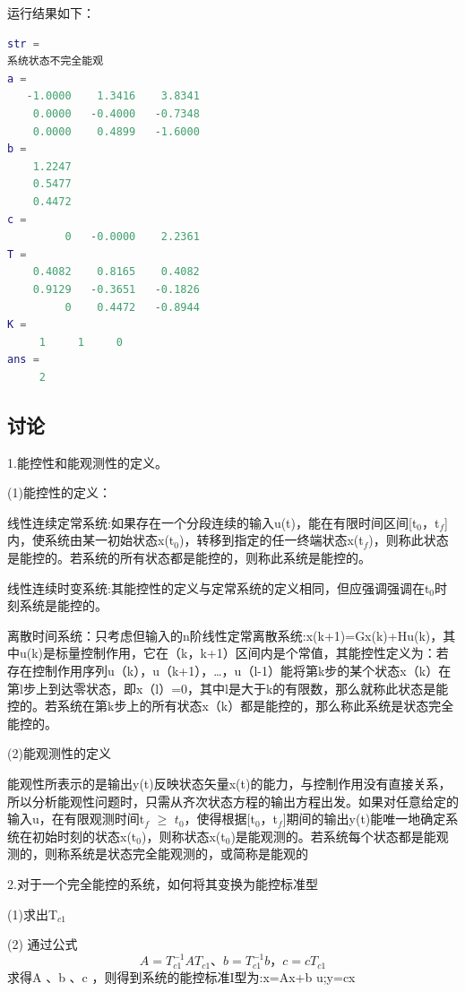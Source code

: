 \documentclass[UTF8]{ctexart}
\begin{document}
\par 运行结果如下：		
\par  \begin{lstlisting}[language=matlab,escapeinside=``]	
str =
系统状态不完全能观
a =
   -1.0000    1.3416    3.8341
    0.0000   -0.4000   -0.7348
    0.0000    0.4899   -1.6000
b =
    1.2247
    0.5477
    0.4472
c =
         0   -0.0000    2.2361
T =
    0.4082    0.8165    0.4082
    0.9129   -0.3651   -0.1826
         0    0.4472   -0.8944
K =
     1     1     0
ans =
     2
\end{lstlisting}

\subsection{讨论}
\par 1.能控性和能观测性的定义。
\par (1)能控性的定义：
\par 线性连续定常系统:如果存在一个分段连续的输入u(t)，能在有限时间区间[t$_{0}$，t$_{f}$]内，使系统由某一初始状态x(t$_{0}$)，转移到指定的任一终端状态x(t$_{f}$)，则称此状态是能控的。若系统的所有状态都是能控的，则称此系统是能控的。
\par 线性连续时变系统:其能控性的定义与定常系统的定义相同，但应强调强调在t$_{0}$时刻系统是能控的。
\par  离散时间系统：只考虑但输入的n阶线性定常离散系统:x(k+1)=Gx(k)+Hu(k)，其中u(k)是标量控制作用，它在（k，k+1）区间内是个常值，其能控性定义为：若存在控制作用序列u（k），u（k+1），…，u（l-1）能将第k步的某个状态x（k）在第l步上到达零状态，即x（l）=0，其中l是大于k的有限数，那么就称此状态是能控的。若系统在第k步上的所有状态x（k）都是能控的，那么称此系统是状态完全能控的。
\par (2)能观测性的定义
\par 能观性所表示的是输出y(t)反映状态矢量x(t)的能力，与控制作用没有直接关系，所以分析能观性问题时，只需从齐次状态方程的输出方程出发。如果对任意给定的输入u，在有限观测时间t$_{f}$ 
$\geq$ $t_{0}$，使得根据[t$_{0}$，t$_{f}$]期间的输出y(t)能唯一地确定系统在初始时刻的状态x(t$_{0}$)，则称状态x(t$_{0}$)是能观测的。若系统每个状态都是能观测的，则称系统是状态完全能观测的，或简称是能观的
\par 2.对于一个完全能控的系统，如何将其变换为能控标准型
\par (1)求出T$_{c1}$
\par (2)	通过公式\begin{equation}A =T_{c1}^{-1}AT_{c1}、b =T_{c1}^{-1}b，c =cT_{c1}\end{equation}求得A 、b 、c ，则得到系统的能控标准I型为:x=Ax+b u;y=cx
\end{document}
